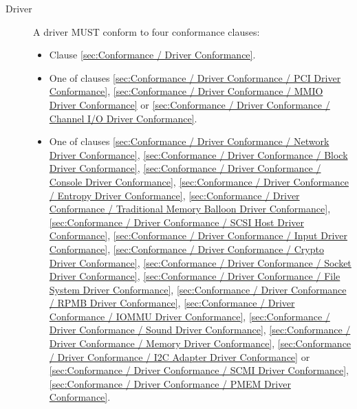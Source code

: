 \begin{description}
\item[Driver] A driver MUST conform to four conformance clauses:
  \begin{itemize}
    \item Clause \ref{sec:Conformance / Driver Conformance}.
    \item One of clauses \ref{sec:Conformance / Driver Conformance / PCI Driver Conformance}, \ref{sec:Conformance / Driver Conformance / MMIO Driver Conformance} or \ref{sec:Conformance / Driver Conformance / Channel I/O Driver Conformance}.
    \item One of clauses
\ref{sec:Conformance / Driver Conformance / Network Driver Conformance},
\ref{sec:Conformance / Driver Conformance / Block Driver Conformance},
\ref{sec:Conformance / Driver Conformance / Console Driver Conformance},
\ref{sec:Conformance / Driver Conformance / Entropy Driver Conformance},
\ref{sec:Conformance / Driver Conformance / Traditional Memory Balloon Driver Conformance},
\ref{sec:Conformance / Driver Conformance / SCSI Host Driver Conformance},
\ref{sec:Conformance / Driver Conformance / Input Driver Conformance},
\ref{sec:Conformance / Driver Conformance / Crypto Driver Conformance},
\ref{sec:Conformance / Driver Conformance / Socket Driver Conformance},
\ref{sec:Conformance / Driver Conformance / File System Driver Conformance},
\ref{sec:Conformance / Driver Conformance / RPMB Driver Conformance},
\ref{sec:Conformance / Driver Conformance / IOMMU Driver Conformance},
\ref{sec:Conformance / Driver Conformance / Sound Driver Conformance},
\ref{sec:Conformance / Driver Conformance / Memory Driver Conformance},
\ref{sec:Conformance / Driver Conformance / I2C Adapter Driver Conformance} or
\ref{sec:Conformance / Driver Conformance / SCMI Driver Conformance},
\ref{sec:Conformance / Driver Conformance / PMEM Driver Conformance}.


\end{itemize}
\end{description}
